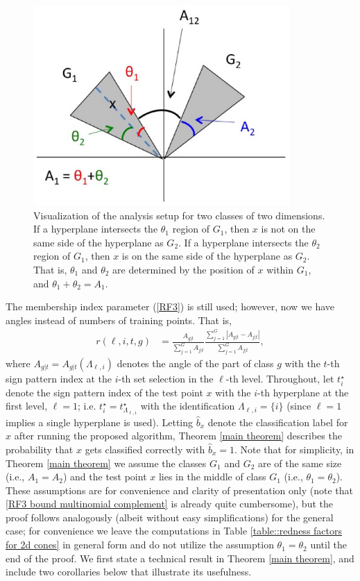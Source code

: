 \documentclass[twoside,11pt]{article}
\newcommand{\RF}{membership index\xspace}
\newcommand{\GamLi}[2]{\Lambda_{#1,#2}}  %
\newcommand{\edit}[1]{{{#1}}}
\begin{document}
\begin{figure}[!htbp]
\centering
\includegraphics[height=3in]{images/Theory/Slide1.eps}
\caption{Visualization of the analysis setup for two classes of two dimensions. If a hyperplane intersects the $\theta_1$ region of $G_1$, then $x$ is not on the same side of the hyperplane as $G_2$. If a hyperplane intersects the $\theta_2$ region of $G_1$, then $x$ is on the same side of the hyperplane as $G_2$. That is, $\theta_1$ and $\theta_2$ are determined by the position of $x$ within $G_1$, and $\theta_1+\theta_2 = A_1$.}
\label{2d cones}
\end{figure}

The \RF parameter (\ref{RF3}) is still used; however, now we have angles instead of numbers of training points. That is,
\begin{align} \label{RF3 continuous}
r(\ell,i,t,g) &= \frac{A_{g|t}}{\sum_{j=1}^G A_{j|t}} \frac{\sum_{j=1}^G |A_{g|t} - A_{j|t}|}{\sum_{j=1}^G A_{j|t}},
\end{align}
where $A_{g|t}\edit{ = A_{g|t}(\GamLi{\ell}{i})}$ denotes the angle of \edit{the part of} class $g$ with the $t$-th sign pattern \edit{index} at the $i$-th set selection in the $\ell$-th \edit{level}.
Throughout, let $t_i^\star$ denote the sign pattern index of the test point $x$ with the $i$-th hyperplane at the first \edit{level}, $\ell=1$; \edit{i.e. $t_i^\star = t_{\Lambda_{\ell,i}}^\star$ with the identification $\Lambda_{\ell, i} = \{i\}$ (since $\ell=1$ implies a single hyperplane is used). }
Letting $\widehat{b}_x$ denote the classification label for $x$ after running the proposed algorithm, Theorem \ref{main theorem} describes the probability that $x$ gets classified correctly with $\widehat{b}_x = 1$. Note that for simplicity, in Theorem \ref{main theorem} we assume the classes $G_1$ and $G_2$ are of the same size (i.e., $A_1=A_2$) and the test point $x$ lies in the middle of class $G_1$ (i.e., $\theta_1 = \theta_2$). These assumptions are for convenience and clarity of presentation only (note that \eqref{RF3 bound multinomial complement} is already quite cumbersome), but the proof follows analogously (albeit without easy simplifications) for the general case; for convenience we leave the computations in Table \ref{table::redness factors for 2d cones} in general form and do not utilize the assumption $\theta_1 = \theta_2$ until the end of the proof.  \edit{We first state a technical result in Theorem \ref{main theorem}, and include two corollaries below that illustrate its usefulness.}
%
\end{document}
